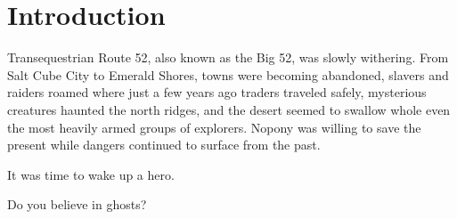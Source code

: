 \chapter{Introduction}

Transequestrian Route 52, also known as the Big 52, was slowly withering. From Salt Cube City to Emerald Shores, towns were becoming abandoned, slavers and raiders roamed where just a few years ago traders traveled safely, mysterious creatures haunted the north ridges, and the desert seemed to swallow whole even the most heavily armed groups of explorers. Nopony was willing to save the present while dangers continued to surface from the past.

It was time to wake up a hero.

\clearpage

\begin{motto}
Do you believe in ghosts?
\end{motto}

